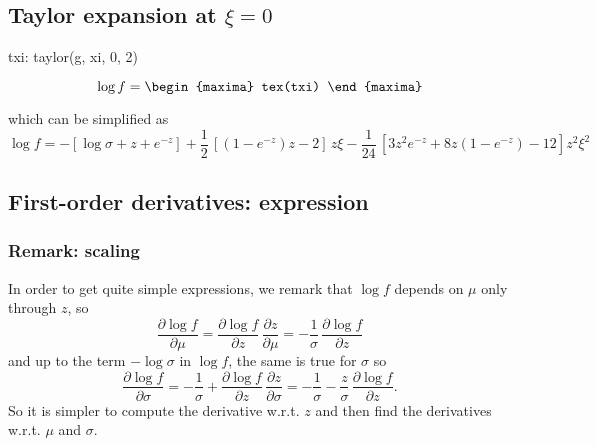 


\subsection{Taylor expansion at $\xi = 0$}

\begin{maxima}
  txi: taylor(g, xi, 0, 2)
\end{maxima}
{\color{MonVertF}
\[
  \log f = 
  \begin{maxima}
    tex(txi)
  \end{maxima}
\]
}

which can be simplified as
{\color{red}
$$
\log f = -\left[ \log \sigma + z + e^{-z} \right] + \frac{1}{2}\,
\left[ (1 -  e^{-z}) z -2  \right]\,z \xi - \frac{1}{24} \,
\left[ 3 z^2 e^{-z} + 8 z (1 - e^{-z}) - 12 \right] z^2 \xi^2
$$}

\subsection{First-order derivatives: expression}

\subsubsection*{Remark: scaling}
In order to get quite simple expressions, we remark that $\log f$
depends on $\mu$ only through $z$, so
$$
\frac{\partial \log f}{\partial \mu} = \frac{\partial \log f}{\partial z} \,
   \dfrac{\partial z}{\partial \mu} = -\frac{1}{\sigma} \, \frac{\partial \log f}{\partial z}
$$ 
and up to the term $-\log \sigma$ in $\log f$, the same is true for
$\sigma$ so
$$
\frac{\partial \log f}{\partial \sigma} =
-\frac{1}{\sigma} + \frac{\partial \log f}{\partial z} \, \dfrac{\partial z}{\partial \sigma} =
-\frac{1}{\sigma} -\frac{z}{\sigma} \, \frac{\partial \log f}{\partial z}.
$$ 
So it is simpler to compute the derivative w.r.t. $z$ and then find the
derivatives w.r.t. $\mu$ and $\sigma$.


